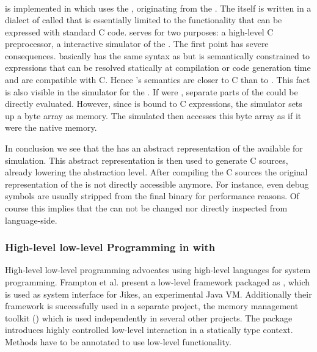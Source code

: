 \subsubsection*{\Squeak \ST \VM}
 \\

\WF is implemented in \PH which uses the , originating from the \Squeak \VM\cite{Inga97a}.
The \VM itself is written in a dialect of \ST called \Slang that is essentially limited to the functionality that can be expressed with standard C code.
\Slang serves for two purposes: a high-level C preprocessor, a interactive simulator of the \VM.
The first point has severe consequences.
\Slang basically has the same syntax as \ST but is semantically constrained to expressions that can be resolved statically at compilation or code generation time and are compatible with C.
Hence \Slang's semantics are closer to C than to \ST.
This fact is also visible in the simulator for the \VM.
If \Slang were \ST, separate parts of the \VM could be directly evaluated.
However, since \Slang is bound to C expressions, the simulator sets up a byte array as memory.
The simulated \VM then accesses this byte array as if it were the native memory.

In conclusion we see that the \PH \VM has an abstract representation of the \VM available for simulation.
This abstract representation is then used to generate C sources, already lowering the abstraction level.
After compiling the C sources the original representation of the \VM is not directly accessible anymore.
For instance, even debug symbols are usually stripped from the final binary for performance reasons.
Of course this implies that the \VM can not be changed nor directly inspected from language-side.


\subsubsection*{High-level low-level Programming in \Jikes with \MMTK}

High-level low-level programming \cite{Fram09a} advocates using high-level languages for system programming.
Frampton et al. present a low-level framework packaged as , which is used as system interface for Jikes, an experimental Java VM.
Additionally their framework is successfully used in a separate project, the memory management toolkit (\MMTK) \cite{Blac04a} which is used independently in several other projects.
The  package introduces highly controlled low-level interaction in a statically type context.
Methods have to be annotated to use low-level functionality. 

